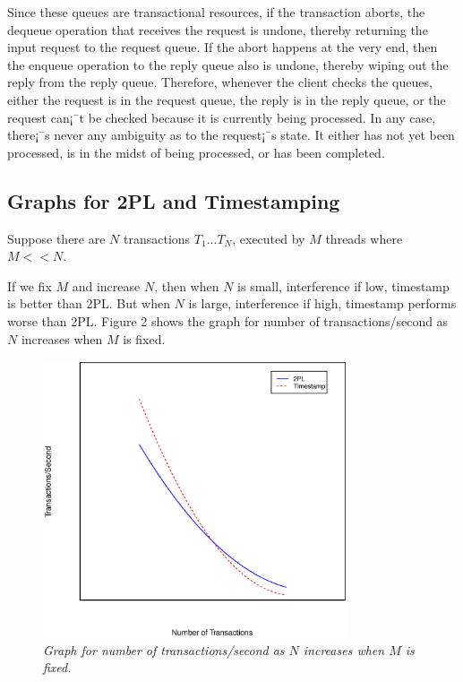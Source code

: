 \documentclass{article}
\begin{document}
Since these queues are transactional resources, if the transaction aborts, the dequeue operation that receives the request is undone, thereby returning the input request to the request queue. If the abort happens at the very end, then the enqueue operation to the reply queue also is undone, thereby wiping out the reply from the reply queue. Therefore, whenever the client checks the queues, either the request is in the request queue, the reply is in the reply queue, or the request can¡¯t be checked because it is currently being processed. In any case, there¡¯s never any ambiguity as to the request¡¯s state. It either has not yet been processed, is in the midst of being processed, or has been completed.

\goodbreak

\subsection{Graphs for 2PL and Timestamping}

Suppose there are $N$ transactions $T_{1}...T_{N}$, executed by $M$ threads where $M<<N$. 

If we fix $M$ and increase $N$, then when $N$ is small, interference if low, timestamp is better than 2PL. But when $N$ is large, interference if high, timestamp performs worse than 2PL. Figure 2 shows the graph for number of transactions/second as $N$ increases when $M$ is fixed.

\begin{figure}[htp]
\centering
\includegraphics[width=9cm]{2pl_vs_ts_1.eps}
\caption{\textit{Graph for number of transactions/second as $N$ increases when $M$ is fixed.}}
\end{figure}
\end{document}
